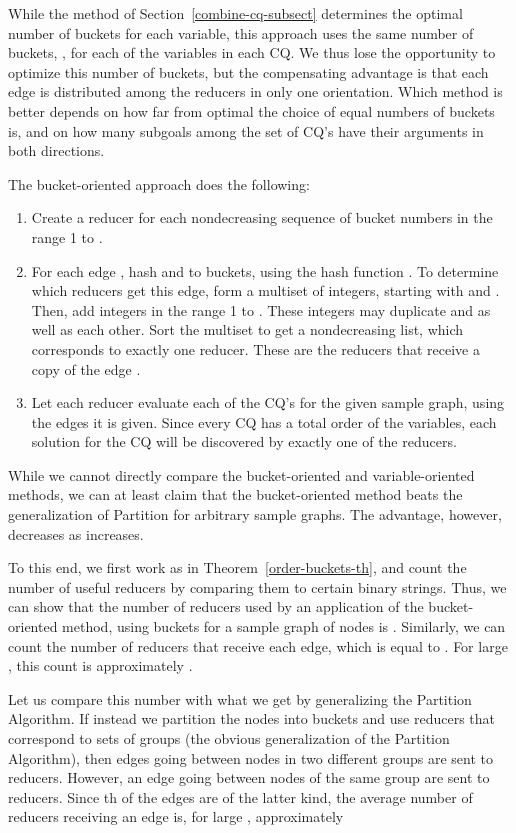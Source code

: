 While the method of Section~\ref{combine-cq-subsect} determines the optimal number of buckets for each variable, this approach uses the same number of buckets, , for each of the variables in each CQ.  We thus lose the opportunity to optimize this number of buckets, but the compensating advantage is that each edge is distributed among the reducers in only one orientation.  Which method is better depends on how far from optimal the choice of equal numbers of buckets is, and on how many subgoals among the set of CQ's have their arguments in both directions.

The bucket-oriented approach does the following:

\begin{enumerate}
\item Create a reducer for each nondecreasing sequence of  bucket numbers in the range 1 to .

\item For each edge , hash  and  to buckets, using the hash function .  To determine which reducers get this edge, form a multiset of integers, starting with  and .  Then, add  integers in the range 1 to .   These integers may duplicate  and  as well as each other.  Sort the multiset to get a nondecreasing list, which corresponds to exactly one reducer.  These are the reducers that receive a copy of the edge .

\item Let each reducer evaluate each of the CQ's for the given sample graph, using the edges it is given.  Since every CQ has a total order of the variables, each solution for the CQ will be discovered by exactly one of the reducers.
\end{enumerate}

While we cannot directly compare the bucket-oriented and vari\-able-oriented methods, we can at least claim that the bucket-ori\-ented method beats the generalization of Partition for arbitrary sample graphs. The advantage, however, decreases as  increases.

To this end, we first work as in Theorem~\ref{order-buckets-th}, and count the number of useful reducers by comparing them to certain binary strings. Thus, we can show that the number of reducers used by an application of the bucket-oriented method, using  buckets for a sample graph of  nodes is .
Similarly, we can count the number of reducers that receive each edge, which is equal to . For large , this count is approximately .

Let us compare this number with what we get by generalizing the Partition Algorithm. If instead we partition the nodes into  buckets and use reducers that correspond to sets of  groups (the obvious generalization of the Partition Algorithm), then edges going between nodes in two different groups are sent to   reducers.  However, an edge going between nodes of the same group are sent to  reducers.  Since th of the edges are of the latter kind, the average number of reducers receiving an edge is, for large , approximately

